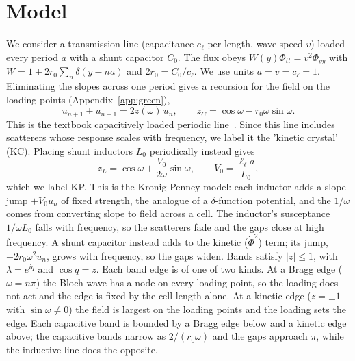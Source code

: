\documentclass[aps,prresearch,twocolumn,superscriptaddress,nofootinbib,longbibliography,floatfix]{revtex4-2}
\begin{document}
\section{Model}\label{sec:model}

We consider a transmission line (capacitance $c_\ell$ per length, wave speed $v$) loaded every period $a$ with a shunt
capacitor $C_0$. The flux obeys $W(y)\Phi_{tt}=v^2\Phi_{yy}$ with $W=1+2r_0\sum_n\delta(y-na)$ and $2r_0=C_0/c_\ell$.
We use units $a=v=c_\ell=1$. Eliminating the slopes across one period gives a recursion for the field on the loading
points (Appendix~\ref{app:green}),
\begin{equation}
u_{n+1}+u_{n-1}=2z(\omega)\,u_n,\qquad z_{C}=\cos\omega-r_0\omega\sin\omega .
\label{eq:disp}
\end{equation}
This is the textbook capacitively loaded periodic line~\cite{Pozar,Brillouin}. Since this line includes scatterers whose response scales with frequency, we label it the 'kinetic crystal' (KC). Placing shunt
inductors $L_0$ periodically instead gives
\begin{equation}
z_{L}=\cos\omega+\frac{V_0}{2\omega}\sin\omega,\qquad V_0=\frac{\ell_\ell a}{L_0},
\label{eq:dispL}
\end{equation}
which we label KP. This is the Kronig-Penney model: each inductor adds a slope jump $+V_0u_n$ of fixed strength, the
analogue of a $\delta$-function potential, and the $1/\omega$ comes from converting slope to field across a cell. The
inductor's susceptance $1/\omega L_0$ falls with frequency, so the scatterers fade and the gaps close at high frequency.
A shunt capacitor instead adds to the kinetic ($\dot\Phi^2$) term; its jump, $-2r_0\omega^2u_n$, grows with frequency,
so the gaps widen. Bands satisfy $|z|\le1$, with $\lambda=e^{iq}$ and $\cos q=z$. Each band edge is of one of two
kinds. At a Bragg edge ($\omega=n\pi$) the Bloch wave has a node on every loading point, so the loading does
not act and the edge is fixed by the cell length alone. At a kinetic edge ($z=\pm1$ with $\sin\omega\neq0$) the
field is largest on the loading points and the loading sets the edge. Each capacitive band is bounded by a Bragg edge
below and a kinetic edge above; the capacitive bands narrow as $2/(r_0\omega)$ and the gaps approach $\pi$, while the
inductive line does the opposite.
\end{document}

